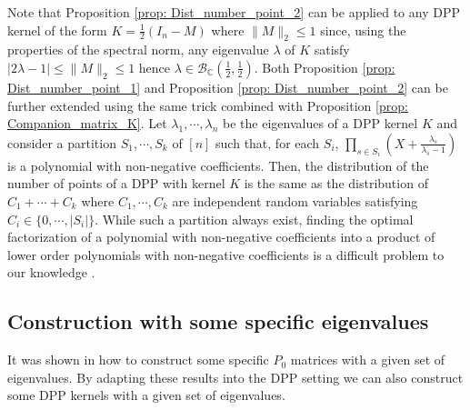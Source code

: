 \documentclass{article}
\numberwithin{equation}{section}
\renewcommand{\leq}{\leqslant}
\theoremstyle{plain}
\begin{document}
\noindent 

Note that Proposition \ref{prop: Dist_number_point_2} can be applied to any DPP kernel of the form $K=\frac 1 2(I_n-M)$ where $\|M\|_2\leq 1$ since, using the properties of the spectral norm, any eigenvalue $\lambda$ of $K$ satisfy $|2\lambda-1|\leq\|M\|_2\leq 1$ hence $\lambda\in \mathcal{B}_\mathbb{C}\left(\frac 1 2, \frac 1 2\right)$. Both Proposition \ref{prop: Dist_number_point_1} and Proposition \ref{prop: Dist_number_point_2} can be further extended using the same trick combined with Proposition \ref{prop: Companion_matrix_K}. Let $\lambda_1,\cdots,\lambda_n$ be the eigenvalues of a DPP kernel $K$ and consider a partition $S_1,\cdots, S_k$ of $[n]$ such that, for each $S_i$, $\prod_{s\in S_i}(X+\frac{\lambda_s}{\lambda_s-1})$ is a polynomial with non-negative coefficients. Then, the distribution of the number of points of a DPP with kernel $K$ is the same as the distribution of $C_1+\cdots+C_k$ where $C_1, \cdots, C_k$ are independent random variables satisfying $C_i\in\{0,\cdots, |S_i|\}$. While such a partition always exist, finding the optimal factorization of a polynomial with non-negative coefficients into a product of lower order polynomials with non-negative coefficients is a difficult problem to our knowledge \cite{Briggs}.

\subsection{Construction with some specific eigenvalues}

\noindent It was shown in \cite{Kellogg} how to construct some specific $P_0$ matrices with a given set of eigenvalues. By adapting these results into the DPP setting we can also construct some DPP kernels with a given set of eigenvalues.
\end{document}
